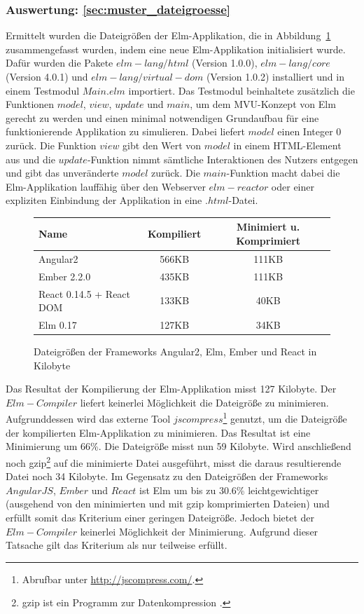 \subsubsection{Auswertung: \ref{sec:muster_dateigroesse} }
Ermittelt wurden die Dateigrößen der Elm-Applikation, die in Abbildung~\ref{fig:dateigroesse-stats} zusammengefasst wurden, indem eine neue Elm-Applikation initialisiert wurde. Dafür wurden die Pakete $elm-lang/html$ (Version 1.0.0), $elm-lang/core$ (Version 4.0.1) und $elm-lang/virtual-dom$ (Version 1.0.2) installiert und in einem Testmodul $Main.elm$ importiert.
Das Testmodul beinhaltete zusätzlich die Funktionen $model$, $view$, $update$ und $main$, um dem \ac{MVU}-Konzept von Elm gerecht zu werden und einen minimal notwendigen Grundaufbau für eine funktionierende Applikation zu simulieren. Dabei liefert $model$ einen Integer $0$ zurück. Die Funktion $view$ gibt den Wert von $model$ in einem \ac{HTML}-Element aus und die $update$-Funktion nimmt sämtliche Interaktionen des Nutzers entgegen und gibt das unveränderte $model$ zurück. Die $main$-Funktion macht dabei die Elm-Applikation lauffähig über den Webserver $elm-reactor$ oder einer expliziten Einbindung der Applikation in eine $.html$-Datei. 
\begin{figure}[h!]
\centering
	\begin{tabular}{ | p{5cm} | c | c |}
	\hline
	 \textbf{Name} 				& \textbf{Kompiliert} 	& \textbf{Minimiert u. Komprimiert}\\
	 \hline
	 Angular2 					& 566KB	& 111KB\\
	 \hline
	 Ember 2.2.0 				& 435KB & 111KB\\
	 \hline
	 React 0.14.5 + React DOM	& 133KB & 40KB\\
	 \hline
	 Elm 0.17					& 127KB & 34KB\\
	 \hline
	\end{tabular}
\caption{Dateigrößen der Frameworks Angular2, Elm, Ember und React in Kilobyte}\label{fig:dateigroesse-stats}
\end{figure}
Das Resultat der Kompilierung der Elm-Applikation misst 127 Kilobyte. Der $Elm-Compiler$ liefert keinerlei Möglichkeit die Dateigröße zu minimieren. Aufgrunddessen wird das externe Tool $jscompress$\footnote{Abrufbar unter \url{http://jscompress.com/}.} genutzt, um die Dateigröße der kompilierten Elm-Applikation zu minimieren. Das Resultat ist eine Minimierung um 66\%. Die Dateigröße misst nun 59 Kilobyte. Wird anschließend noch gzip\footnote{gzip ist ein Programm zur Datenkompression \cite[Vgl.]{google-gzip}.} auf die minimierte Datei ausgeführt, misst die daraus resultierende Datei noch 34 Kilobyte. Im Gegensatz zu den Dateigrößen der Frameworks $AngularJS$, $Ember$ und $React$ ist Elm um bis zu 30.6\% leichtgewichtiger (ausgehend von den minimierten und mit gzip komprimierten Dateien) und erfüllt somit das Kriterium einer geringen Dateigröße. Jedoch bietet der $Elm-Compiler$ keinerlei Möglichkeit der Minimierung. Aufgrund dieser Tatsache gilt das Kriterium als nur teilweise erfüllt.
